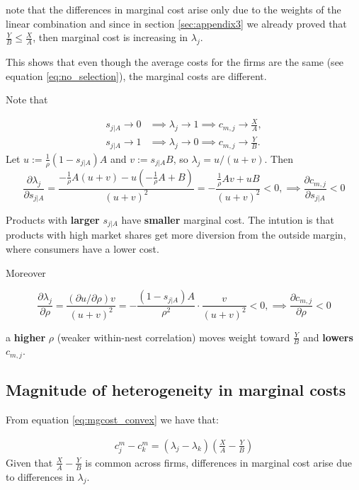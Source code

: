 \documentclass[12pt]{article}
\theoremstyle{plain}
\theoremstyle{plain}
\begin{document}
note that the differences in marginal cost arise only due to the weights of the linear combination and since  in section \ref{sec:appendix3} we already proved that $ \frac{Y}{B} \leq \frac{X}{A}$, then marginal cost is increasing in  $\lambda_j$. 

This shows that even though the average costs for the firms are the same (see equation \ref{eq:no_selection}), the marginal costs are different. 

Note that 

\begin{align*}
s_{j|A} \to 0 &\implies \lambda_j \to 1 \implies c_{m,j} \to \frac{X}{A}, \\
s_{j|A} \to 1 &\implies \lambda_j \to 0 \implies c_{m,j} \to \frac{Y}{B}.
\end{align*}
Let $u := \frac{1}{\rho}(1-s_{j|A})A$ and $v := s_{j|A}B$, so $\lambda_j = u/(u+v)$. Then
\[
\frac{\partial \lambda_j}{\partial s_{j|A}} = \frac{-\frac{1}{\rho}A(u+v) - u(-\frac{1}{\rho}A+B)}{(u+v)^2} = -\frac{\frac{1}{\rho}Av + uB}{(u+v)^2} < 0, \implies  \frac{\partial c_{m,j}}{\partial s_{j|A}} < 0
\]

Products with \textbf{larger} $s_{j|A}$ have \textbf{smaller} marginal cost. The intution is that products with high market shares get more diversion from the outside margin, where consumers have a lower cost. 

Moreover 
 
\[
\frac{\partial \lambda_j}{\partial \rho} = \frac{(\partial u / \partial \rho)v}{(u+v)^2} = -\frac{(1-s_{j|A})A}{\rho^2} \cdot \frac{v}{(u+v)^2} < 0, \implies  \frac{\partial c_{m,j}}{\partial \rho} < 0 
\]


a \textbf{higher} $\rho$ (weaker within-nest correlation) moves weight toward $\frac{Y}{B}$ and \textbf{lowers} $c_{m,j}$.


   
 

\bigskip

\newpage
\subsection{Magnitude of heterogeneity in marginal costs}\label{sec:appendix3.2}

From equation \ref{eq:mgcost_convex} we have that: 

 \begin{align} 
    c^m_j -c^m_k = (\lambda_j - \lambda_k)\left(\frac{X}{A}-\frac{Y}{B}\right)
\end{align}
Given that $\frac{X}{A}-\frac{Y}{B}$ is common across firms, differences in marginal cost arise due to differences in $\lambda_j$. 
\end{document}
